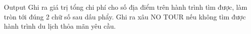 Output
Ghi ra giá trị tổng chi phí cho số địa điểm trên hành trình tìm được, làm tròn tới đúng 2 chữ số sau dấu phẩy. Ghi ra xâu NO TOUR nếu không tìm được hành trình du lịch thỏa mãn yêu cầu.